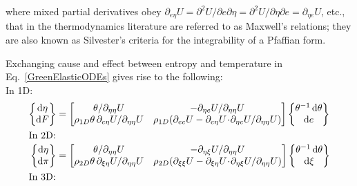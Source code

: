 where mixed partial derivatives obey $\partial_{e \eta} U = \partial^2 U / \partial e \partial \eta = \partial^2 U / \partial \eta \partial e = \partial_{\eta e} U$, etc., that in the thermo\-dynamics literature are referred to as Maxwell's relations; they are also known as Silvester's criteria for the integrability of a Pfaffian form.

Exchanging cause and effect between entropy and temperature in Eq.~\ref{GreenElasticODEs} gives rise to the following: \\ In 1D:
\small
\begin{subequations}
    \label{HelmholtzElasticODEs}
    \begin{align}
    \left\{ \begin{matrix} \mathrm{d} \eta \\ 
    \mathrm{d} F \end{matrix} \right\} & = \begin{bmatrix}
    \theta /\partial_{\eta\eta} U & -\partial_{\eta e} U / 
    \partial_{\eta\eta} U \\
    \rho_{1D} \theta \, \partial_{e\eta} U / \partial_{\eta\eta} U & \rho_{1D} ( \partial_{ee} U - \partial_{e\eta} U \!\cdot\! \partial_{\eta e} U / \partial_{\eta\eta} U ) \end{bmatrix} 
    \left\{ \begin{matrix} \theta^{-1} \, \mathrm{d} \theta \\
    \mathrm{d} e \end{matrix} \right\} \\
    \intertext{In 2D:}
    \left\{ \begin{matrix} \mathrm{d} \eta \\ 
    \mathrm{d} \pi \end{matrix} \right\} & = \begin{bmatrix}
    \theta /\partial_{\eta\eta} U & -\partial_{\eta \xi} U / \partial_{\eta\eta} U \\
    \rho_{2D} \theta \, \partial_{\xi\eta} U / \partial_{\eta\eta} U & \rho_{2D} ( \partial_{\xi\xi} U - \partial_{\xi\eta} U \!\cdot\! \partial_{\eta \xi} U / \partial_{\eta\eta} U ) \end{bmatrix} \left\{ \begin{matrix} \theta^{-1} \, \mathrm{d} \theta \\
    \mathrm{d} \xi \end{matrix} \right\} \label{HelmholtzMembrane} \\
    \intertext{In 3D:}

\end{align}
\end{subequations}
